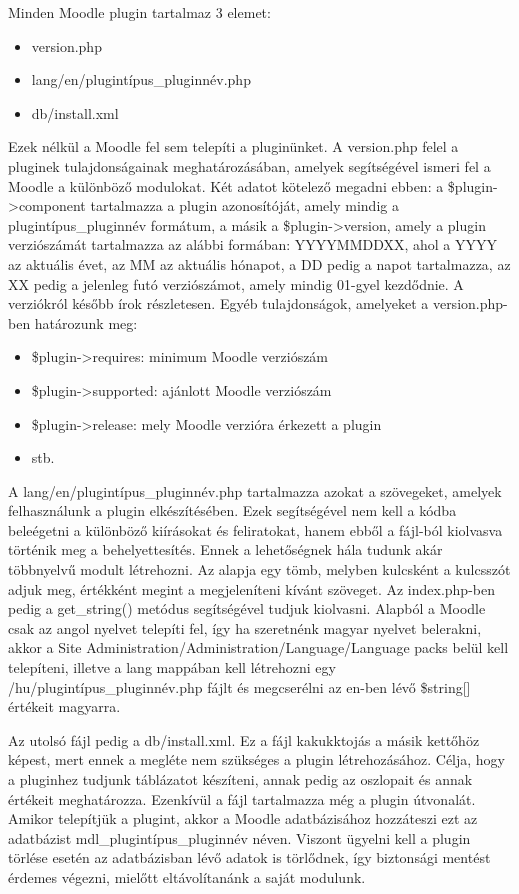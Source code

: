Minden Moodle plugin tartalmaz 3 elemet:
\begin{itemize}
    \item version.php
    \item lang/en/plugintípus\_pluginnév.php
    \item db/install.xml
\end{itemize}

Ezek nélkül a Moodle fel sem telepíti a pluginünket. A version.php felel a pluginek tulajdonságainak meghatározásában, amelyek segítségével ismeri fel a Moodle a különböző modulokat. Két adatot kötelező megadni ebben: a \$plugin->component tartalmazza a plugin azonosítóját, amely mindig a plugintípus\_pluginnév formátum, a másik a \$plugin->version, amely a plugin verziószámát tartalmazza az alábbi formában: YYYYMMDDXX, ahol a YYYY az aktuális évet, az MM az aktuális hónapot, a DD pedig a napot tartalmazza, az XX pedig a jelenleg futó verziószámot, amely mindig 01-gyel kezdődnie. A verziókról később írok részletesen. Egyéb tulajdonságok, amelyeket a version.php-ben határozunk meg:
\begin{itemize}
    \item \$plugin->requires: minimum Moodle verziószám
    \item \$plugin->supported: ajánlott Moodle verziószám
    \item \$plugin->release: mely Moodle verzióra érkezett a plugin
    \item stb.
\end{itemize}

A lang/en/plugintípus\_pluginnév.php tartalmazza azokat a szövegeket, amelyek felhasználunk a plugin elkészítésében. Ezek segítségével nem kell a kódba beleégetni a különböző kiírásokat és feliratokat, hanem ebből a fájl-ból kiolvasva történik meg a behelyettesítés. Ennek a lehetőségnek hála tudunk akár többnyelvű modult létrehozni. Az alapja egy tömb, melyben kulcsként a kulcsszót adjuk meg, értékként megint a megjeleníteni kívánt szöveget. Az index.php-ben pedig a get\_string() metódus segítségével tudjuk kiolvasni. Alapból a Moodle csak az angol nyelvet telepíti fel, így ha szeretnénk magyar nyelvet belerakni, akkor a Site Administration/Administration/Language/Language packs belül kell telepíteni, illetve a lang mappában kell létrehozni egy /hu/plugintípus\_pluginnév.php fájlt és megcserélni az en-ben lévő \$string[] értékeit magyarra. \par

Az utolsó fájl pedig a db/install.xml. Ez a fájl kakukktojás a másik kettőhöz képest, mert ennek a megléte nem szükséges a plugin létrehozásához. Célja, hogy a pluginhez tudjunk táblázatot készíteni, annak pedig az oszlopait és annak értékeit meghatározza. Ezenkívül a fájl tartalmazza még a plugin útvonalát. Amikor telepítjük a plugint, akkor a Moodle adatbázisához hozzáteszi ezt az adatbázist mdl\_plugintípus\_pluginnév néven. Viszont ügyelni kell a plugin törlése esetén az adatbázisban lévő adatok is törlődnek, így biztonsági mentést érdemes végezni, mielőtt eltávolítanánk a saját modulunk.\par

